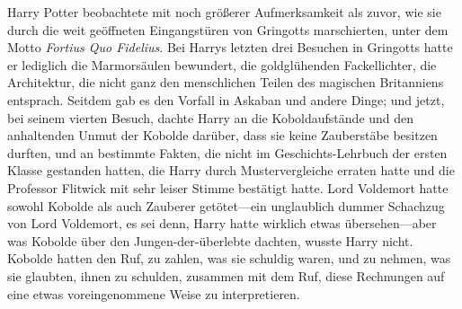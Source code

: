 Harry Potter beobachtete mit noch größerer Aufmerksamkeit als zuvor, wie sie durch die weit geöffneten Eingangstüren von Gringotts marschierten, unter dem Motto \emph{Fortius Quo Fidelius}. Bei Harrys letzten drei Besuchen in Gringotts hatte er lediglich die Marmorsäulen bewundert, die goldglühenden Fackellichter, die Architektur, die nicht ganz den menschlichen Teilen des magischen Britanniens entsprach. Seitdem gab es den Vorfall in Askaban und andere Dinge; und jetzt, bei seinem vierten Besuch, dachte Harry an die Koboldaufstände und den anhaltenden Unmut der Kobolde darüber, dass sie keine Zauberstäbe besitzen durften, und an bestimmte Fakten, die nicht im Geschichts-Lehrbuch der ersten Klasse gestanden hatten, die Harry durch Mustervergleiche erraten hatte und die Professor Flitwick mit sehr leiser Stimme bestätigt hatte. Lord Voldemort hatte sowohl Kobolde als auch Zauberer getötet—ein unglaublich dummer Schachzug von Lord Voldemort, es sei denn, Harry hatte wirklich etwas übersehen—aber was Kobolde über den Jungen-der-überlebte dachten, wusste Harry nicht. Kobolde hatten den Ruf, zu zahlen, was sie schuldig waren, und zu nehmen, was sie glaubten, ihnen zu schulden, zusammen mit dem Ruf, diese Rechnungen auf eine etwas voreingenommene Weise zu interpretieren.

